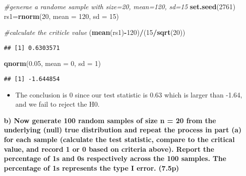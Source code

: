\documentclass[]{article}
\newenvironment{Shaded}{\begin{snugshade}}{\end{snugshade}}
\newcommand{\CommentTok}[1]{\textcolor[rgb]{0.56,0.35,0.01}{\textit{#1}}}
\newcommand{\DataTypeTok}[1]{\textcolor[rgb]{0.13,0.29,0.53}{#1}}
\newcommand{\DecValTok}[1]{\textcolor[rgb]{0.00,0.00,0.81}{#1}}
\newcommand{\FloatTok}[1]{\textcolor[rgb]{0.00,0.00,0.81}{#1}}
\newcommand{\KeywordTok}[1]{\textcolor[rgb]{0.13,0.29,0.53}{\textbf{#1}}}
\newcommand{\NormalTok}[1]{#1}
\newcommand{\OperatorTok}[1]{\textcolor[rgb]{0.81,0.36,0.00}{\textbf{#1}}}
\providecommand{\tightlist}{%
  \setlength{\itemsep}{0pt}\setlength{\parskip}{0pt}}
\begin{document}
\begin{Shaded}
\begin{Highlighting}[]
\CommentTok{#generae a randome sample with size=20, mean=120, sd=15}
\KeywordTok{set.seed}\NormalTok{(}\DecValTok{2761}\NormalTok{)}
\NormalTok{rs1=}\KeywordTok{rnorm}\NormalTok{(}\DecValTok{20}\NormalTok{, }\DataTypeTok{mean =} \DecValTok{120}\NormalTok{, }\DataTypeTok{sd =} \DecValTok{15}\NormalTok{)}

\CommentTok{#calculate the criticle value}
\NormalTok{(}\KeywordTok{mean}\NormalTok{(rs1)}\OperatorTok{-}\DecValTok{120}\NormalTok{)}\OperatorTok{/}\NormalTok{(}\DecValTok{15}\OperatorTok{/}\KeywordTok{sqrt}\NormalTok{(}\DecValTok{20}\NormalTok{))}
\end{Highlighting}
\end{Shaded}

\begin{verbatim}
## [1] 0.6303571
\end{verbatim}

\begin{Shaded}
\begin{Highlighting}[]
\KeywordTok{qnorm}\NormalTok{(}\FloatTok{0.05}\NormalTok{, }\DataTypeTok{mean =} \DecValTok{0}\NormalTok{, }\DataTypeTok{sd =} \DecValTok{1}\NormalTok{)}
\end{Highlighting}
\end{Shaded}

\begin{verbatim}
## [1] -1.644854
\end{verbatim}

\begin{itemize}
\tightlist
\item
  The conclusion is 0 since our test statistic is 0.63 which is larger
  than -1.64, and we fail to reject the H0.
\end{itemize}

\textbf{b) Now generate 100 random samples of size n = 20 from the
underlying (null) true distribution and repeat the process in part (a)
for each sample (calculate the test statistic, compare to the critical
value, and record 1 or 0 based on criteria above). Report the percentage
of 1s and 0s respectively across the 100 samples. The percentage of 1s
represents the type I error. (7.5p)}
\end{document}
